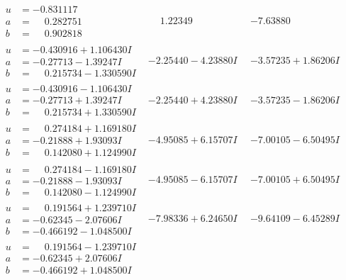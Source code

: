 \documentclass[1p]{elsarticle_modified}
\theoremstyle{definition}
\begin{document}
$$\begin{array}{c|c|c}
\begin{aligned}
u &= -0.831117\phantom{ +0.000000I} \\
a &= \phantom{-}0.282751\phantom{ +0.000000I} \\
b &= \phantom{-}0.902818\phantom{ +0.000000I}\end{aligned}
 & \phantom{-}1.22349\phantom{ +0.000000I} & -7.63880\phantom{ +0.000000I} \\ \hline\begin{aligned}
u &= -0.430916 + 1.106430 I \\
a &= -0.27713 - 1.39247 I \\
b &= \phantom{-}0.215734 - 1.330590 I\end{aligned}
 & -2.25440 - 4.23880 I & -3.57235 + 1.86206 I \\ \hline\begin{aligned}
u &= -0.430916 - 1.106430 I \\
a &= -0.27713 + 1.39247 I \\
b &= \phantom{-}0.215734 + 1.330590 I\end{aligned}
 & -2.25440 + 4.23880 I & -3.57235 - 1.86206 I \\ \hline\begin{aligned}
u &= \phantom{-}0.274184 + 1.169180 I \\
a &= -0.21888 + 1.93093 I \\
b &= \phantom{-}0.142080 + 1.124990 I\end{aligned}
 & -4.95085 + 6.15707 I & -7.00105 - 6.50495 I \\ \hline\begin{aligned}
u &= \phantom{-}0.274184 - 1.169180 I \\
a &= -0.21888 - 1.93093 I \\
b &= \phantom{-}0.142080 - 1.124990 I\end{aligned}
 & -4.95085 - 6.15707 I & -7.00105 + 6.50495 I \\ \hline\begin{aligned}
u &= \phantom{-}0.191564 + 1.239710 I \\
a &= -0.62345 - 2.07606 I \\
b &= -0.466192 - 1.048500 I\end{aligned}
 & -7.98336 + 6.24650 I & -9.64109 - 6.45289 I \\ \hline\begin{aligned}
u &= \phantom{-}0.191564 - 1.239710 I \\
a &= -0.62345 + 2.07606 I \\
b &= -0.466192 + 1.048500 I\end{aligned}

\end{array}$$
\end{document}
